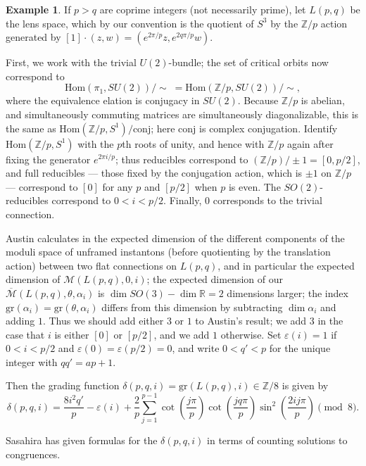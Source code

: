 \documentclass{memo-l}
\theoremstyle{definition}
\newtheorem{example}[theorem]{Example}
\theoremstyle{remark}
\numberwithin{section}{chapter}
\numberwithin{equation}{chapter}
\begin{document}
\begin{example}If $p > q$ are coprime integers (not necessarily prime), let $L(p,q)$ be the lens space, which by our convention is the quotient of $S^3$ by the $\mathbb Z/p$ action generated by $[1] \cdot (z, w) = (e^{2\pi/p}z, e^{2q\pi/p} w).$

First, we work with the trivial $U(2)$-bundle; the set of critical orbits now correspond to 
$$\text{Hom}(\pi_1, SU(2))/\!\sim \; = \text{Hom}(\mathbb Z/p, SU(2))/\!\sim,$$ 
where the equivalence elation is conjugacy in $SU(2)$. Because $\mathbb Z/p$ is abelian, and simultaneously commuting matrices are simultaneously diagonalizable, this is the same as $\text{Hom}(\mathbb Z/p, S^1)/\text{conj}$; here $\text{conj}$ is complex conjugation. Identify $\text{Hom}(\mathbb Z/p, S^1)$ with the $p$th roots of unity, and hence with $\mathbb Z/p$ again after fixing the generator $e^{2\pi i/p}$; thus reducibles correspond to $(\mathbb Z/p)/\pm 1 = [0, p/2]$, and full reducibles --- those fixed by the conjugation action, which is $\pm 1$ on $\mathbb Z/p$ --- correspond to $[0]$ for any $p$ and $[p/2]$ when $p$ is even. The $SO(2)$-reducibles correspond to $0 < i < p/2$. Finally, $0$ corresponds to the trivial connection.

Austin calculates in \cite{LensSpaceModuli} the expected dimension of the different components of the moduli space of unframed instantons (before quotienting by the translation action) between two flat connections on $L(p,q)$, and in particular the expected dimension of $\mathcal M(L(p,q), 0, i)$; the expected dimension of our $\overline{\mathcal M}(L(p,q), \theta, \alpha_i)$ is $\dim SO(3) - \dim \mathbb R = 2$ dimensions larger; the index $\text{gr}(\alpha_i) = \text{gr}(\theta, \alpha_i)$ differs from this dimension by subtracting $\dim \alpha_i$ and adding $1$. Thus we should add either $3$ or $1$ to Austin's result; we add $3$ in the case that $i$ is either $[0]$ or $[p/2]$, and we add $1$ otherwise. Set $\varepsilon(i) = 1$ if $0 < i < p/2$ and $\varepsilon(0) = \varepsilon(p/2) = 0$, and write $0 < q' < p$ for the unique integer with $qq' = ap + 1$.

Then the grading function $\delta(p,q,i) = \text{gr}(L(p,q), i) \in \mathbb Z/8$ is given by $$\delta(p,q,i) = \frac{8i^2q'}{p} - \varepsilon(i) + \frac{2}{p} \sum_{j=1}^{p-1} \cot\left(\frac{j \pi}{p}\right)\cot\left(\frac{jq \pi}{p}\right)\sin^2\left(\frac{2ij\pi}{p}\right) \pmod{8}.$$

Sasahira \cite[Corollary~5.3]{SasahiraLens} has given formulas for the $\delta(p,q,i)$ in terms of counting solutions to congruences.


\end{example}
\end{document}

